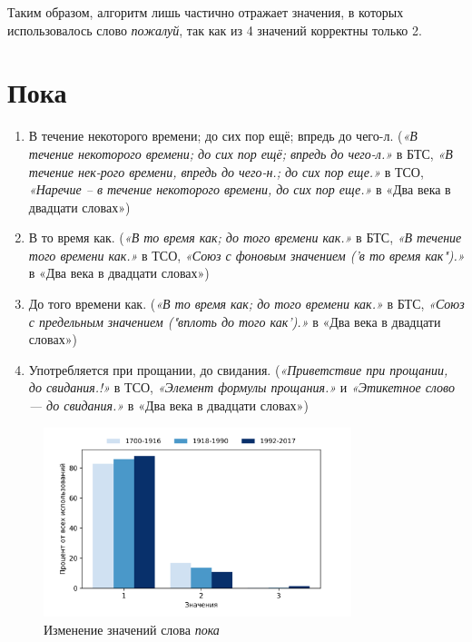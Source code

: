 Таким образом, алгоритм лишь частично отражает значения, в которых использовалось
слово \textit{пожалуй}, так как из 4 значений корректны только 2.

\section*{Пока}

\begin{enumerate}
    \item В течение некоторого времени; до сих пор ещё; впредь до чего-л.
(\textit{«В течение некоторого времени; до сих пор ещё; впредь до чего-л.»} в БТС,
\textit{«В течение нек-рого времени, впредь до чего-н.; до сих пор еще.»} в ТСО,
\textit{«Наречие – в течение некоторого времени, до сих пор еще.»} в «Два века в двадцати словах»)
    \item В то время как.
(\textit{«В то время как; до того времени как.»} в БТС,
\textit{«В течение того времени как.»} в ТСО,
\textit{«Союз с фоновым значением (’в то время как").»} в «Два века в двадцати словах»)
    \item До того времени как.
(\textit{«В то время как; до того времени как.»} в БТС,
\textit{«Союз с предельным значением ("вплоть до того как’).»} в «Два века в двадцати словах»)
    \item Употребляется при прощании, до свидания.
(\textit{«Приветствие при прощании, до свидания.!»} в ТСО,
\textit{«Элемент формулы прощания.»} и \textit{«Этикетное слово — до свидания.»} в «Два века в двадцати словах»)
\end{enumerate}

\begin{figure}[H]
	\centering
	\includegraphics[width=0.8\textwidth]{img/visualizations/poka_minimal}
	\caption{Изменение значений слова \textit{пока}}
	\label{fig:Пока}
\end{figure}

